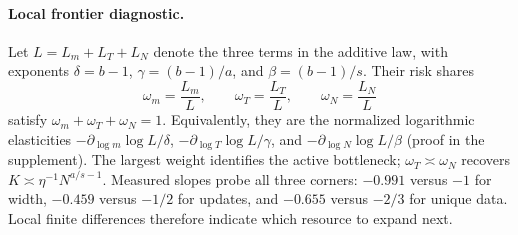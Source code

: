 \paragraph{Local frontier diagnostic.}
Let $L=L_m+L_T+L_N$ denote the three terms in the additive law, with exponents
$\delta=b-1$, $\gamma=(b-1)/a$, and $\beta=(b-1)/s$. Their risk shares
\[
\omega_m=\frac{L_m}{L},\qquad
\omega_T=\frac{L_T}{L},\qquad
\omega_N=\frac{L_N}{L}
\]
satisfy $\omega_m+\omega_T+\omega_N=1$. Equivalently, they are the normalized
logarithmic elasticities $-\partial_{\log m}\log L/\delta$,
$-\partial_{\log T}\log L/\gamma$, and
$-\partial_{\log N}\log L/\beta$ (proof in the supplement). The largest
weight identifies the active bottleneck; $\omega_T\asymp\omega_N$ recovers
$K\asymp\eta^{-1}N^{a/s-1}$. Measured slopes probe all three corners:
$-0.991$ versus $-1$ for width, $-0.459$ versus $-1/2$ for updates, and
$-0.655$ versus $-2/3$ for unique data. Local finite differences therefore
indicate which resource to expand next.
